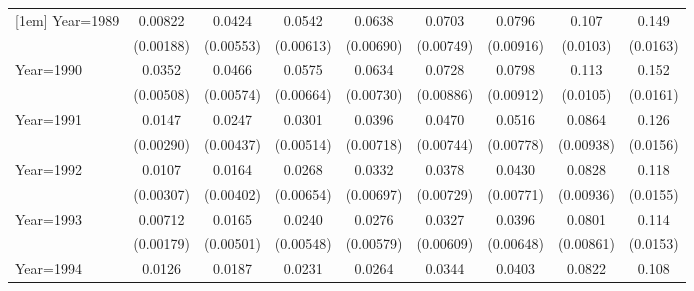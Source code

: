 \begin{table}[htbp]
\begin{tabular}{l*{8}{c}}
[1em]
Year=1989           &     0.00822\sym{***}&      0.0424\sym{***}&      0.0542\sym{***}&      0.0638\sym{***}&      0.0703\sym{***}&      0.0796\sym{***}&       0.107\sym{***}&       0.149\sym{***}\\
                    &   (0.00188)         &   (0.00553)         &   (0.00613)         &   (0.00690)         &   (0.00749)         &   (0.00916)         &    (0.0103)         &    (0.0163)         \\
[1em]
Year=1990           &      0.0352\sym{***}&      0.0466\sym{***}&      0.0575\sym{***}&      0.0634\sym{***}&      0.0728\sym{***}&      0.0798\sym{***}&       0.113\sym{***}&       0.152\sym{***}\\
                    &   (0.00508)         &   (0.00574)         &   (0.00664)         &   (0.00730)         &   (0.00886)         &   (0.00912)         &    (0.0105)         &    (0.0161)         \\
[1em]
Year=1991           &      0.0147\sym{***}&      0.0247\sym{***}&      0.0301\sym{***}&      0.0396\sym{***}&      0.0470\sym{***}&      0.0516\sym{***}&      0.0864\sym{***}&       0.126\sym{***}\\
                    &   (0.00290)         &   (0.00437)         &   (0.00514)         &   (0.00718)         &   (0.00744)         &   (0.00778)         &   (0.00938)         &    (0.0156)         \\
[1em]
Year=1992           &      0.0107\sym{***}&      0.0164\sym{***}&      0.0268\sym{***}&      0.0332\sym{***}&      0.0378\sym{***}&      0.0430\sym{***}&      0.0828\sym{***}&       0.118\sym{***}\\
                    &   (0.00307)         &   (0.00402)         &   (0.00654)         &   (0.00697)         &   (0.00729)         &   (0.00771)         &   (0.00936)         &    (0.0155)         \\
[1em]
Year=1993           &     0.00712\sym{***}&      0.0165\sym{***}&      0.0240\sym{***}&      0.0276\sym{***}&      0.0327\sym{***}&      0.0396\sym{***}&      0.0801\sym{***}&       0.114\sym{***}\\
                    &   (0.00179)         &   (0.00501)         &   (0.00548)         &   (0.00579)         &   (0.00609)         &   (0.00648)         &   (0.00861)         &    (0.0153)         \\
[1em]
Year=1994           &      0.0126\sym{***}&      0.0187\sym{***}&      0.0231\sym{***}&      0.0264\sym{***}&      0.0344\sym{***}&      0.0403\sym{***}&      0.0822\sym{***}&       0.108\sym{***}\\

\end{tabular}
\end{table}
